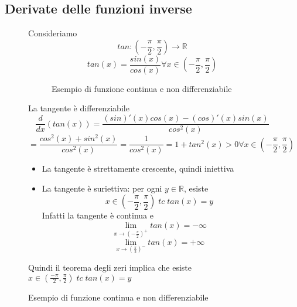 \documentclass[a4paper]{article}
\theoremstyle{break}
\theoremstyle{break}
\theoremstyle{break}
\theoremstyle{break}
\begin{document}
\subsection{Derivate delle funzioni inverse}
\begin{figure}[H]
  \begin{example}
    Consideriamo
    \[
      tan: (-\frac{\pi}{2}, \frac{\pi}{2}) \to \mathbb{R}
    \] 
    \[
      tan(x) = \frac{sin(x)}{cos(x)} \forall x \in (-\frac{\pi}{2}, \frac{\pi}{2})
    \] 
    \begin{figure}[H]
      \begin{center}
      \end{center}
      \caption{Esempio di funzione continua e non differenziabile}
    \end{figure}

    La tangente è differenziabile
    \[
      \frac{d}{dx}(tan(x)) = \frac{(sin)'(x)cos(x)-(cos)'(x)sin(x)}{cos^2(x)}
    \] 
    \[
      =\frac{cos^2(x)+sin^2(x)}{cos^2(x)} = \frac{1}{cos^2(x)} = 1+tan^2(x) > 0 \forall x \in (-\frac{\pi}{2}, \frac{\pi}{2})
    \] 
    \begin{itemize}
      \item 
        La tangente è strettamente crescente, quindi iniettiva
      \item La tangente è suriettiva: per ogni \( y \in \mathbb{R} \), esiste \[
          x \in (-\frac{\pi}{2}, \frac{\pi}{2}) \;tc\; tan(x)=y
        \] 
        Infatti la tangente è continua e 
        \[
          \lim_{x \to (-\frac{\pi}{2})^+} tan(x) = -\infty
        \] 
        \[
          \lim_{x \to (\frac{\pi}{2})^-} tan(x) = +\infty
        \] 
    \end{itemize}
    Quindi il teorema degli zeri implica che esiste \( x \in (\frac{-\pi}{2}, \frac{\pi}{2})\;tc\; tan(x)=y \)
  \end{example}
\end{figure}
\end{document}
